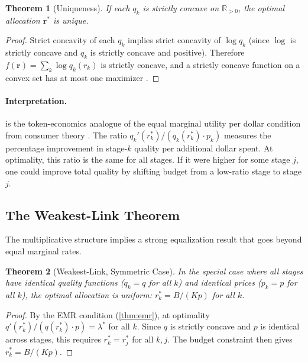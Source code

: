\documentclass[11pt, a4paper, copyright]{googledeepmind}
\newtheorem{theorem}{Theorem}[section]
\begin{document}
\begin{theorem}[Uniqueness]\label{thm:uniqueness}
If each $q_k$ is strictly concave on $\mathbb{R}_{>0}$, the optimal allocation $\mathbf{r}^*$ is unique.
\end{theorem}

\begin{proof}
Strict concavity of each $q_k$ implies strict concavity of $\log q_k$ (since $\log$ is strictly concave and $q_k$ is strictly concave and positive). Therefore $f(\mathbf{r}) = \sum_k \log q_k(r_k)$ is strictly concave, and a strictly concave function on a convex set has at most one maximizer \citep{rockafellar1970}.
\end{proof}

\paragraph{Interpretation.}
 is the token-economics analogue of the equal marginal utility per dollar condition from consumer theory \citep{mas-colell1995}. The ratio $q_k'(r_k^*) / (q_k(r_k^*) \cdot p_k)$ measures the percentage improvement in stage-$k$ quality per additional dollar spent. At optimality, this ratio is the same for all stages. If it were higher for some stage $j$, one could improve total quality by shifting budget from a low-ratio stage to stage $j$.

\subsection{The Weakest-Link Theorem}

The multiplicative structure implies a strong equalization result that goes beyond equal marginal rates.

\begin{theorem}[Weakest-Link, Symmetric Case]\label{thm:weakest-link}
In the special case where all stages have identical quality functions ($q_k = q$ for all $k$) and identical prices ($p_k = p$ for all $k$), the optimal allocation is uniform: $r_k^* = B / (Kp)$ for all $k$.
\end{theorem}

\begin{proof}
By the EMR condition (\cref{thm:emr}), at optimality $q'(r_k^*) / (q(r_k^*) \cdot p) = \lambda^*$ for all $k$. Since $q$ is strictly concave and $p$ is identical across stages, this requires $r_k^* = r_j^*$ for all $k, j$. The budget constraint then gives $r_k^* = B/(Kp)$.
\end{proof}
\end{document}
